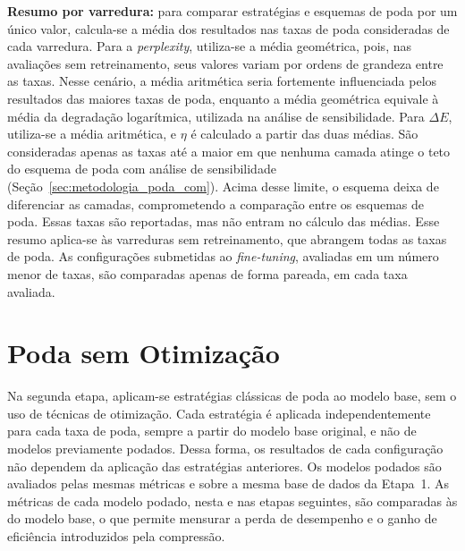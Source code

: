 \textbf{Resumo por varredura:} para comparar estratégias e esquemas de poda por um único
valor, calcula-se a média dos resultados nas taxas de poda consideradas de cada varredura.
Para a
\textit{perplexity}, utiliza-se a média geométrica, pois, nas avaliações sem retreinamento,
seus valores variam por ordens de grandeza entre as taxas. Nesse cenário, a média
aritmética seria fortemente influenciada pelos resultados das maiores taxas de poda,
enquanto a média geométrica equivale à média da degradação logarítmica, utilizada na
análise de sensibilidade. Para $\Delta E$, utiliza-se a média aritmética, e $\eta$ é
calculado a partir das duas médias. São consideradas apenas as taxas até a maior em que
nenhuma camada atinge o teto do esquema de poda com análise de sensibilidade
(Seção~\ref{sec:metodologia_poda_com}). Acima desse limite, o esquema deixa de diferenciar
as camadas, comprometendo a comparação entre os esquemas de poda. Essas taxas são
reportadas, mas não entram no cálculo das médias. Esse resumo aplica-se às varreduras sem
retreinamento, que abrangem todas as taxas de poda. As configurações submetidas ao
\textit{fine-tuning}, avaliadas em um número menor de taxas, são comparadas apenas de forma
pareada, em cada taxa avaliada.

\section{Poda sem Otimização}\label{sec:metodologia_poda_sem}

Na segunda etapa, aplicam-se estratégias clássicas de poda ao modelo base, sem o uso de
técnicas de otimização. Cada estratégia é aplicada independentemente para cada taxa de poda,
sempre a partir do modelo base original, e não de modelos previamente podados. Dessa forma,
os resultados de cada configuração não dependem da aplicação das estratégias anteriores. Os
modelos podados são avaliados pelas mesmas métricas e sobre a mesma base de dados da
Etapa~1. As métricas de cada modelo podado, nesta e nas etapas
seguintes, são comparadas às do modelo base, o que permite mensurar a perda de desempenho e
o ganho de eficiência introduzidos pela compressão.

